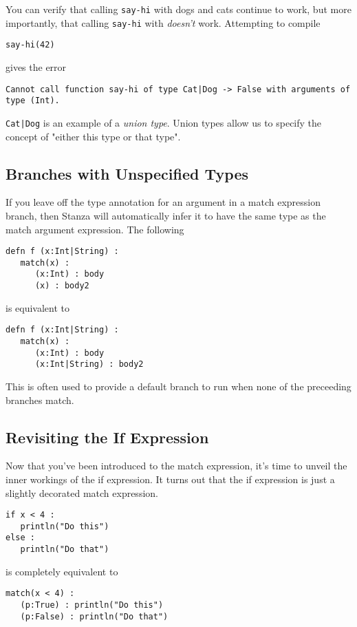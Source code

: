 \documentclass[10pt,oneside]{book}
\begin{document}
You can verify that calling \texttt{\frenchspacing say-hi} with dogs and cats continue to work, but more importantly, that calling \texttt{\frenchspacing say-hi} with \texttt{} {\em doesn't} work. Attempting to compile
\begin{lstlisting}
say-hi(42)
\end{lstlisting}
gives the error
\begin{lstlisting}
Cannot call function say-hi of type Cat|Dog -> False with arguments of type (Int).
\end{lstlisting}

\texttt{\frenchspacing Cat|Dog} is an example of a {\em union type}. Union types allow us to specify the concept of "either this type or that type". 

\subsection*{Branches with Unspecified Types}
If you leave off the type annotation for an argument in a match expression branch, then Stanza will automatically infer it to have the same type as the match argument expression. The following
\begin{lstlisting}
defn f (x:Int|String) :
   match(x) :
      (x:Int) : body
      (x) : body2
\end{lstlisting}
is equivalent to
\begin{lstlisting}
defn f (x:Int|String) :
   match(x) :
      (x:Int) : body
      (x:Int|String) : body2
\end{lstlisting}

This is often used to provide a default branch to run when none of the preceeding branches match.

\subsection*{Revisiting the If Expression}
Now that you've been introduced to the match expression, it's time to unveil the inner workings of the if expression. It turns out that the if expression is just a slightly decorated match expression.
\begin{lstlisting}
if x < 4 :
   println("Do this")
else :
   println("Do that")
\end{lstlisting}
is completely equivalent to
\begin{lstlisting}
match(x < 4) :
   (p:True) : println("Do this")
   (p:False) : println("Do that")
\end{lstlisting}
\end{document}
